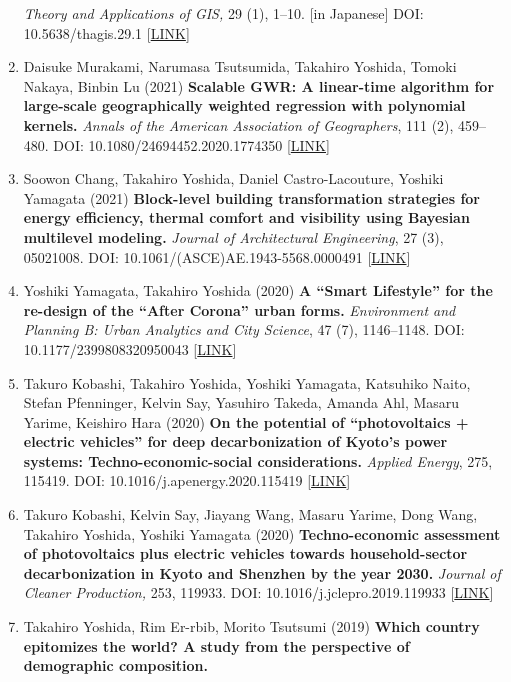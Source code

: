 \documentclass[
]{book}
\begin{document}
\begin{enumerate}
  \emph{Theory and Applications of GIS,} 29 (1), 1--10. {[}in Japanese{]}
  DOI: 10.5638/thagis.29.1 {[}\href{https://www.jstage.jst.go.jp/article/thagis/29/1/29_1/_article/-char/en}{LINK}{]}
\item
  Daisuke Murakami, Narumasa Tsutsumida, Takahiro Yoshida, Tomoki Nakaya, Binbin Lu (2021)
  \textbf{Scalable GWR: A linear-time algorithm for large-scale geographically weighted regression with polynomial kernels.}
  \emph{Annals of the American Association of Geographers}, 111 (2), 459--480.
  DOI: 10.1080/24694452.2020.1774350 {[}\href{https://www.tandfonline.com/doi/full/10.1080/24694452.2020.1774350}{LINK}{]}
\item
  Soowon Chang, Takahiro Yoshida, Daniel Castro-Lacouture, Yoshiki Yamagata (2021) \textbf{Block-level building transformation strategies for energy efficiency, thermal comfort and visibility using Bayesian multilevel modeling.}
  \emph{Journal of Architectural Engineering}, 27 (3), 05021008.
  DOI: 10.1061/(ASCE)AE.1943-5568.0000491 {[}\href{https://ascelibrary.org/doi/abs/10.1061/\%28ASCE\%29AE.1943-5568.0000491}{LINK}{]}
\item
  Yoshiki Yamagata, Takahiro Yoshida (2020)
  \textbf{A ``Smart Lifestyle'' for the re-design of the ``After Corona'' urban forms.}
  \emph{Environment and Planning B: Urban Analytics and City Science}, 47 (7), 1146--1148.
  DOI: 10.1177/2399808320950043 {[}\href{http://dx.doi.org/10.1177/2399808320950043}{LINK}{]}
\item
  Takuro Kobashi, Takahiro Yoshida, Yoshiki Yamagata, Katsuhiko Naito, Stefan Pfenninger, Kelvin Say, Yasuhiro Takeda, Amanda Ahl, Masaru Yarime, Keishiro Hara (2020)
  \textbf{On the potential of ``photovoltaics + electric vehicles'' for deep decarbonization of Kyoto's power systems: Techno-economic-social considerations.}
  \emph{Applied Energy}, 275, 115419.
  DOI: 10.1016/j.apenergy.2020.115419 {[}\href{https://doi.org/10.1016/j.apenergy.2020.115419}{LINK}{]}
\item
  Takuro Kobashi, Kelvin Say, Jiayang Wang, Masaru Yarime, Dong Wang, Takahiro Yoshida, Yoshiki Yamagata (2020)
  \textbf{Techno-economic assessment of photovoltaics plus electric vehicles towards household-sector decarbonization in Kyoto and Shenzhen by the year 2030.}
  \emph{Journal of Cleaner Production,} 253, 119933.
  DOI: 10.1016/j.jclepro.2019.119933 {[}\href{https://doi.org/10.1016/j.jclepro.2019.119933}{LINK}{]}
\item
  Takahiro Yoshida, Rim Er-rbib, Morito Tsutsumi (2019)
  \textbf{Which country epitomizes the world? A study from the perspective of demographic composition.}

\end{enumerate}
\end{document}
